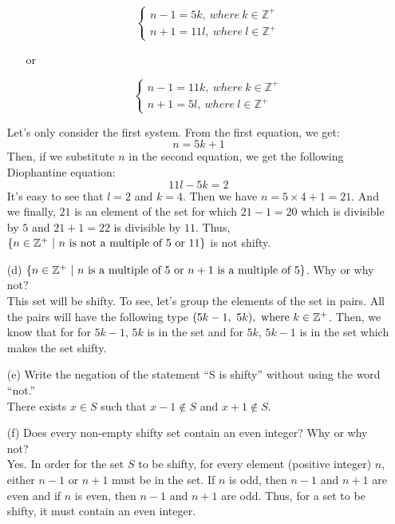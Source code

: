 \documentclass[12pt, a4paper]{article}                  %
\begin{document}
\begin{enumerate}
\begin{enumerate}
$$
\begin{cases}
n - 1 = 5k, \ where \ k \in \mathbb{Z}^+\\
n + 1 = 11l, \ where \ l \in \mathbb{Z}^+
\end{cases}
$$
\begin{center}
or
\end{center}
$$
\begin{cases}
n - 1 = 11k, \ where \ k \in \mathbb{Z}^+\\
n + 1 = 5l, \ where \ l \in \mathbb{Z}^+
\end{cases}
$$
\end{enumerate}
Let's only consider the first system. From the first equation, we get:
$$n = 5k + 1$$
Then, if we substitute $n$ in the second equation, we get the following Diophantine equation:
$$11l - 5k = 2$$
It's easy to see that $l = 2$ and $k = 4$. Then we have $n = 5 \times 4 + 1 = 21$.
And we finally, $21$ is an element of the set for which $21 - 1 = 20$ which is divisible
by $5$ and $21 + 1 = 22$ is divisible by $11$.
Thus,  $\{n \in \mathbb{Z}^+ \ \vert \ n \ \textnormal{is not a multiple of 5 or 11} \}$ is not shifty.
\\
\item[(d)]
$\{n \in \mathbb{Z}^+ \ \vert \ n \ \textnormal{is a multiple of 5 or $n + 1$ is a multiple of 5} \}$.
Why or why not?\\

This set will be shifty. To see, let's group the elements of the set in pairs.
All the pairs will have the following type $(5k-1,\ 5k), \ \textnormal{where} \ k \in \mathbb{Z}^+$.
Then, we know that for for $5k-1$, $5k$ is in the set and for $5k$, $5k-1$ is in the set
which makes the set shifty.
\\
\item[(e)]
Write the negation of the statement “S is shifty” without using the word “not.”\\

There exists $x \in S$ such that $x-1 \notin S$ and $x+1 \notin S$.
\\
\item[(f)]
Does every non-empty shifty set contain an even integer? Why or why not?\\

Yes. In order for the set $S$ to be shifty, for every element (positive integer) $n$, either $n - 1$
or $n + 1$ must be in the set. If $n$ is odd, then $n-1$ and $n+1$ are even and if $n$ is even, then
$n-1$ and $n+1$ are odd. Thus, for a set to be shifty, it must contain an even integer.


\end{enumerate}
\end{document}
